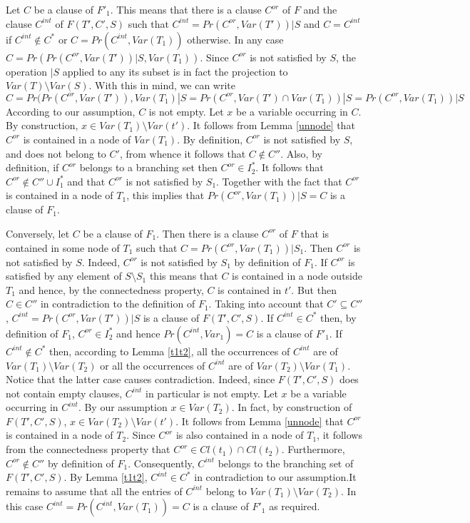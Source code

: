 \documentclass{llncs}
\begin{document}
Let $C$ be a clause of $F'_1$. This means that there is a clause $C^{or}$ of $F$ and the clause
$C^{int}$ of $F(T',C',S)$ such that $C^{int}=Pr(C^{or},Var(T'))|S$ and $C=C^{int}$ if $C^{int} \notin C^*$ or
$C=Pr(C^{int},Var(T_1))$ otherwise. In any case $C=Pr(Pr(C^{or},Var(T'))|S,Var(T_1))$.
Since $C^{or}$ is not satisfied by $S$, the operation $|S$ applied to any its subset is in
fact the projection to $Var(T)\setminus Var(S)$. With this in mind, we can write
$$C=Pr(Pr(C^{or},Var(T')),Var(T_1)|S=Pr(C^{or},Var(T') \cap Var(T_1))|S=Pr(C^{or},Var(T_1))|S$$
According to our assumption, $C$ is not empty. Let $x$ be a variable occurring in $C$.
By construction, $x \in Var(T_1)\setminus Var(t')$. It follows from Lemma \ref{unnode}
that $C^{or}$ is contained in a node of $Var(T_1)$. By definition, $C^{or}$ is not satisfied
by $S$, and does not belong to $C'$, from whence it follows that $C \notin C''$.  
Also, by definition, if $C^{or}$ belongs to a branching set then $C^{or} \in I^*_2$.
It follows that $C^{or} \notin C'' \cup I^*_1$ and that $C^{or}$ is not satisfied by $S_1$.
Together with the fact that $C^{or}$ is contained in a node of $T_1$, this implies that
$Pr(C^{or},Var(T_1))|S=C$ is a clause of $F_1$.

Conversely, let $C$ be a clause of $F_1$. Then there is a clause $C^{or}$ of $F$ that is contained
in some node of $T_1$ such that $C=Pr(C^{or},Var(T_1))|S_1$. Then $C^{or}$ is not satisfied by $S$.
Indeed, $C^{or}$ is not satisfied by $S_1$ by definition of $F_1$. If $C^{or}$ is satisfied by
any element of $S \setminus S_1$ this means that $C$ is contained in a node outside $T_1$ and hence,
by the connectedness property, $C$ is contained in $t'$. But then $C \in C''$ in contradiction to the 
definition of $F_1$. Taking into account that $C' \subseteq C''$, $C^{int}=Pr(C^{or},Var(T'))|S$
is a clause of $F(T',C',S)$.  If $C^{int} \in C^*$ then, by definition of $F_1$, $C^{or} \in I^*_2$
and hence $Pr(C^{int},Var_1)=C$ is a clause of $F'_1$. If $C^{int} \notin C^*$ then, according to
Lemma \ref{t1t2}, all the occurrences of $C^{int}$ are of $Var(T_1) \setminus Var(T_2)$ or all the
occurrences of $C^{int}$ are of $Var(T_2) \setminus Var(T_1)$. Notice that the latter case causes
contradiction. Indeed, since $F(T',C',S)$ does not contain empty clauses, $C^{int}$ in particular is
not empty. Let $x$ be a variable occurring in $C^{int}$. By our assumption $x \in Var(T_2)$. 
In fact, by construction of $F(T',C',S)$, $x \in Var(T_2) \setminus Var(t')$. It follows from Lemma \ref{unnode}
that $C^{or}$ is contained in a node of $T_2$. Since $C^{or}$ is also contained in a node of $T_1$, it follows from the
connectedness property that $C^{or} \in Cl(t_1) \cap Cl(t_2)$. Furthermore, $C^{or} \notin C''$ by definition
of $F_1$. Consequently, $C^{int}$ belongs to the branching set of $F(T',C',S)$. By Lemma \ref{t1t2},
$C^{int} \in C^*$ in contradiction to our assumption.It remains to assume that all the entries of $C^{int}$
belong to $Var(T_1) \setminus Var(T_2)$. In this case $C^{int}=Pr(C^{int},Var(T_1))=C$ is a clause of $F'_1$
as required. 
\end{document}
